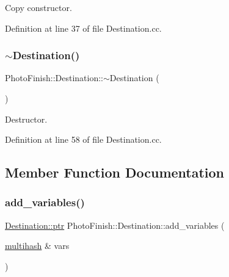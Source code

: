 Copy constructor. 



Definition at line 37 of file Destination.\+cc.

\mbox{\label{class_photo_finish_1_1_destination_aa40a461fbb7dcf5a628967cfc647aeb2}} 
\subsubsection{\texorpdfstring{$\sim$\+Destination()}{~Destination()}}
{\footnotesize\ttfamily Photo\+Finish\+::\+Destination\+::$\sim$\+Destination (\begin{DoxyParamCaption}{ }\end{DoxyParamCaption})}



Destructor. 



Definition at line 58 of file Destination.\+cc.



\subsection{Member Function Documentation}
\mbox{\label{class_photo_finish_1_1_destination_a1cb318744749f6c2e2919e61651345df}} 
\subsubsection{\texorpdfstring{add\+\_\+variables()}{add\_variables()}}
{\footnotesize\ttfamily \hyperlink{class_photo_finish_1_1_destination_a0d282a905cd81c3f0e6d7233c9bc7774}{Destination\+::ptr} Photo\+Finish\+::\+Destination\+::add\+\_\+variables (\begin{DoxyParamCaption}\item[{\hyperlink{namespace_photo_finish_a6f41796f162687538b7da5c7a95e2d18}{multihash} \&}]{vars }\end{DoxyParamCaption})}



